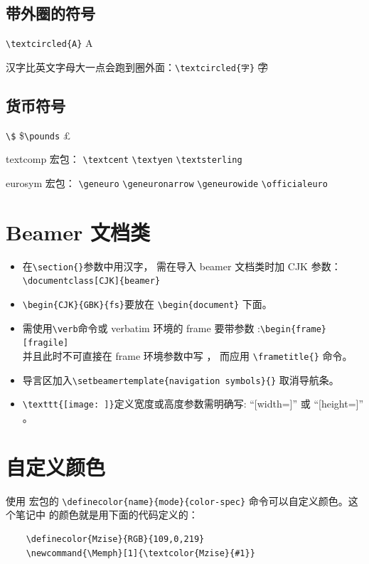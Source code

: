 \documentclass[a4paper,11pt]{article}
\begin{document}
\subsection{带外圈的符号}
\verb+\textcircled{A}+ \textcircled{A}

汉字比英文字母大一点会跑到圈外面：\verb+\textcircled{字}+ \textcircled{字}

\subsection{货币符号}
\verb+\$+ \$\hspace{1cm}\verb+\pounds+ \pounds

textcomp 宏包：
\verb+\textcent+ \textcent\hfill
\verb+\textyen+ \textyen\hfill
\verb+\textsterling+ \textsterling

eurosym 宏包：
\verb+\geneuro+ \geneuro\hfill
\verb+\geneuronarrow+ \geneuronarrow\hfill
\verb+\geneurowide+ \geneurowide\hfill
\verb+\officialeuro+ \officialeuro

\section{Beamer 文档类}
\begin{itemize}
	\item 在\verb+\section{}+参数中用汉字，
		需在导入 beamer 文档类时加 CJK 参数：\\
		\verb+\documentclass[CJK]{beamer}+
	\item \verb+\begin{CJK}{GBK}{fs}+要放在 \verb+\begin{document}+ 下面。
	\item 需使用\verb+\verb+命令或 verbatim 环境的 frame 要带参数
		:\verb+\begin{frame}[fragile]+\\
			并且此时不可直接在 frame 环境参数中写 ，
			而应用 \verb+\frametitle{}+ 命令。
	\item 导言区加入\verb+\setbeamertemplate{navigation symbols}{}+
		取消导航条。
	\item \verb+\texttt{[image: ]}+定义宽度或高度参数需明确写:
		``[width=]'' 或 ``[height=]'' 。
\end{itemize}

\section{自定义颜色}
使用  宏包的 \verb+\definecolor{name}{mode}{color-spec}+
命令可以自定义颜色。这个笔记中 
的颜色就是用下面的代码定义的：
\begin{Verbatim}
	\definecolor{Mzise}{RGB}{109,0,219}
	\newcommand{\Memph}[1]{\textcolor{Mzise}{#1}}
\end{Verbatim}
\end{document}
